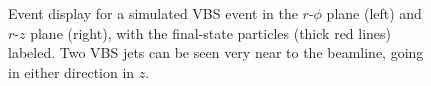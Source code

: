 \begin{figure}[htb]
    \centering
    \qquad
    \caption[Event display for a simulated VBS \WH event]{
        Event display for a simulated VBS \WH event in the $r$-$\phi$ plane (left) and $r$-$z$ plane (right), with the final-state particles (thick red lines) labeled. 
        Two VBS jets can be seen very near to the beamline, going in either direction in $z$. 
    }
    \label{fig:vbswh_fireworks}
\end{figure}

